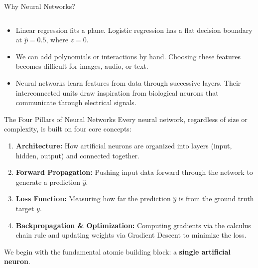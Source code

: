 \begin{frame}{Why Neural Networks?}
\begin{tabular}{@{}ll@{}}
    \end{tabular}
    \begin{itemize}
        \item Linear regression fits a plane. Logistic regression has a flat decision boundary at $\hat p=0.5$, where $z=0$.
        \item We can add polynomials or interactions by hand. Choosing these features becomes difficult for images, audio, or text.
        \item Neural networks learn features from data through successive layers. Their interconnected units draw inspiration from biological neurons that communicate through electrical signals.
    \end{itemize}
\end{frame}

\begin{frame}{The Four Pillars of Neural Networks}
    Every neural network, regardless of size or complexity, is built on four core concepts:
    \begin{enumerate}
        \item \textbf{Architecture:} How artificial neurons are organized into layers (input, hidden, output) and connected together.
        \item \textbf{Forward Propagation:} Pushing input data forward through the network to generate a prediction $\hat{y}$.
        \item \textbf{Loss Function:} Measuring how far the prediction $\hat{y}$ is from the ground truth target $y$.
        \item \textbf{Backpropagation \& Optimization:} Computing gradients via the calculus chain rule and updating weights via Gradient Descent to minimize the loss.
    \end{enumerate}
    \svspace{0.4em}
    We begin with the fundamental atomic building block: a \textbf{single artificial neuron}.
\end{frame}

